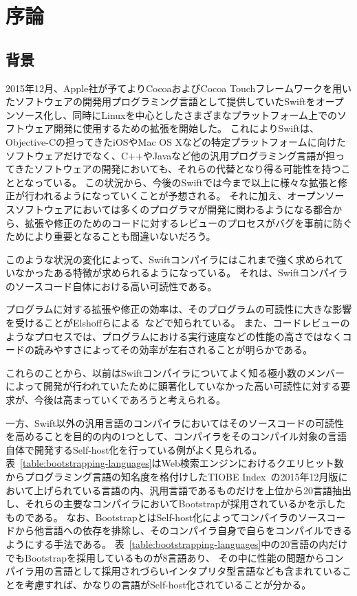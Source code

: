 \chapter{序論}
\label{introduction}

\section{背景}
\label{introduction:background}

2015年12月、Apple社が予てよりCocoaおよびCocoa Touchフレームワークを用いたソフトウェアの開発用プログラミング言語として提供していたSwiftをオープンソース化し、同時にLinuxを中心としたさまざまなプラットフォーム上でのソフトウェア開発に使用するための拡張を開始した。
これによりSwiftは、Objective-Cの担ってきたiOSやMac OS Xなどの特定プラットフォームに向けたソフトウェアだけでなく、C++やJavaなど他の汎用プログラミング言語が担ってきたソフトウェアの開発においても、それらの代替となり得る可能性を持つこととなっている。
この状況から、今後のSwiftでは今まで以上に様々な拡張と修正が行われるようになっていくことが予想される。
それに加え、オープンソースソフトウェアにおいては多くのプログラマが開発に関わるようになる都合から、拡張や修正のためのコードに対するレビューのプロセスがバグを事前に防ぐためにより重要となることも間違いないだろう。

このような状況の変化によって、Swiftコンパイラにはこれまで強く求められていなかったある特徴が求められるようになっている。
それは、Swiftコンパイラのソースコード自体における高い可読性である。

プログラムに対する拡張や修正の効率は、そのプログラムの可読性に大きな影響を受けることがElshoffらによる~\cite{elshoff}などで知られている。
また、コードレビューのようなプロセスでは、プログラムにおける実行速度などの性能の高さではなくコードの読みやすさによってその効率が左右されることが明らかである。

これらのことから、以前はSwiftコンパイラについてよく知る極小数のメンバーによって開発が行われていたために顕著化していなかった高い可読性に対する要求が、今後は高まっていくであろうと考えられる。

一方、Swift以外の汎用言語のコンパイラにおいてはそのソースコードの可読性を高めることを目的の内の1つとして、コンパイラをそのコンパイル対象の言語自体で開発するSelf-host化を行っている例がよく見られる。
表~\ref{table:bootstrapping-languages}はWeb検索エンジンにおけるクエリヒット数からプログラミング言語の知名度を格付けしたTIOBE Index~\cite{tiobe}の2015年12月版において上げられている言語の内、汎用言語であるものだけを上位から20言語抽出し、それらの主要なコンパイラにおいてBootstrapが採用されているかを示したものである。
なお、BootstrapとはSelf-host化によってコンパイラのソースコードから他言語への依存を排除し、そのコンパイラ自身で自らをコンパイルできるようにする手法である。
表~\ref{table:bootstrapping-languages}中の20言語の内だけでもBootstrapを採用しているものが8言語あり、 その中に性能の問題からコンパイラ用の言語として採用されづらいインタプリタ型言語なども含まれていることを考慮すれば、かなりの言語がSelf-host化されていることが分かる。

